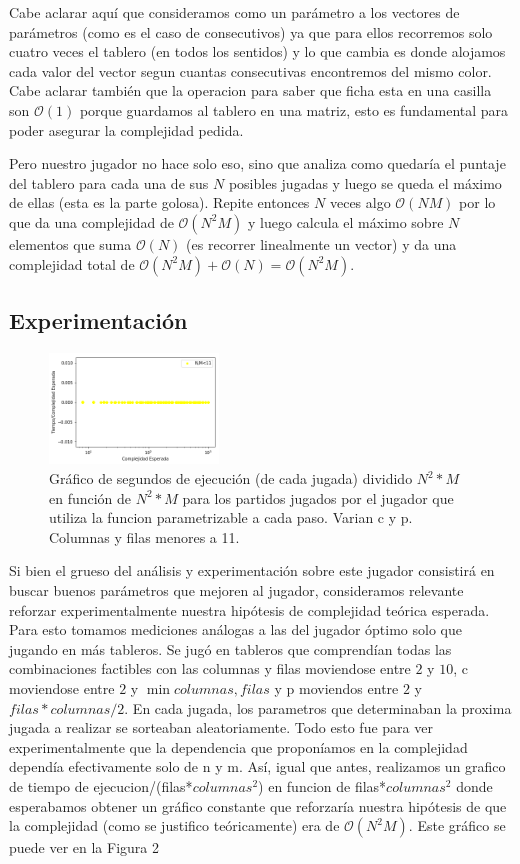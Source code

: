 \documentclass[A4paper,oneside,fleqn,11pt]{article}
\theoremstyle{definition}
\begin{document}
Cabe aclarar aquí que consideramos como un parámetro a los vectores de parámetros (como es el caso de consecutivos) ya que para ellos recorremos solo cuatro veces el tablero (en todos los sentidos) y lo que cambia es donde alojamos cada valor del vector segun cuantas consecutivas encontremos del mismo color. Cabe aclarar también que la operacion para saber que ficha esta en una casilla son $\mathcal{O}(1)$ porque guardamos al tablero en una matriz, esto es fundamental para poder asegurar la complejidad pedida.

 
Pero nuestro jugador no hace solo eso, sino que analiza como quedaría el puntaje del tablero para cada una de sus $N$ posibles jugadas y luego se queda el máximo de ellas (esta es la parte golosa). Repite entonces $N$ veces algo  $\mathcal{O}(N M)$ por lo que da una complejidad de $\mathcal{O}(N^2 M)$ y luego calcula el máximo sobre $N$ elementos que suma $\mathcal{O}(N)$ (es recorrer linealmente un vector) y da una complejidad total de $\mathcal{O}(N^2 M) +\mathcal{O}(N) = \mathcal{O}(N^2 M)$.


\subsection{Experimentación}


\begin{figure}
	\includegraphics[width=0.4\textwidth]{complejidad2.png}
	\caption{ Gráfico de segundos de ejecución (de cada jugada) dividido $N^2 *M$ en función de $N^2 * M$ para los partidos jugados por el jugador que utiliza la funcion parametrizable a cada paso. Varian c y p. Columnas y filas menores a 11.}
\end{figure}

Si bien el grueso del análisis y experimentación sobre este jugador consistirá en buscar buenos parámetros que mejoren al jugador, consideramos relevante reforzar experimentalmente nuestra hipótesis de complejidad teórica esperada. Para esto tomamos mediciones análogas a las del jugador óptimo solo que jugando en más tableros. Se jugó en tableros que comprendían todas las combinaciones factibles con las columnas y filas moviendose entre $2$ y $10$, c moviendose entre $2$ y $\min{columnas,filas}$ y p moviendos entre $2$ y $filas*columnas/2$. En cada jugada, los parametros que determinaban la proxima jugada a realizar se sorteaban aleatoriamente. Todo esto fue para ver experimentalmente que la dependencia que proponíamos en la complejidad dependía efectivamente solo de n y m. Así, igual que antes, realizamos un grafico de tiempo de ejecucion/(filas*$columnas^2$) en funcion de filas*$columnas^2$ donde esperabamos obtener un gráfico constante que reforzaría nuestra hipótesis de que la complejidad (como se justifico teóricamente) era de $\mathcal{O}(N^2 M)$. Este gráfico se puede ver en la Figura 2
\end{document}

